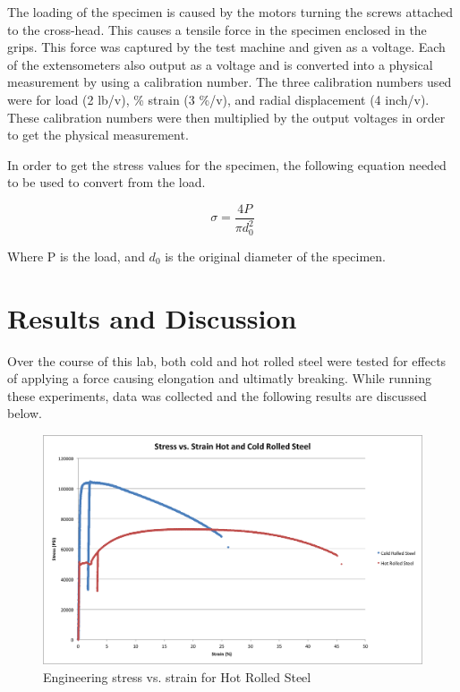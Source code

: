 \documentclass[12pt]{report}
\begin{document}
The loading of the specimen is caused by the motors turning the screws attached to the cross-head. This causes a tensile force in the specimen enclosed in the grips. This force was captured by the test machine and given as a voltage. Each of the extensometers also output as a voltage and is converted into a physical measurement by using a calibration number. The three calibration numbers used were for load (2 lb/v), \% strain (3 \%/v), and radial displacement (4 inch/v). These calibration numbers were then multiplied by the output voltages in order to get the physical measurement. 

In order to get the stress values for the specimen, the following equation needed to be used to convert from the load. 

\begin{equation}
        \sigma = \frac{4P}{\pi d_0^2}
	\label{equation:equation1}
\end{equation}

Where P is the load, and \(d_0\) is the original diameter of the specimen. 

\section{Results and Discussion}
\doublespacing

Over the course of this lab, both cold and hot rolled steel were tested for effects of applying a force causing elongation and ultimatly breaking. While running these experiments, data was collected and the following results are discussed below.

\begin{figure}[H]
	\includegraphics[width=1\textwidth]{stress_vs_strain.png}
	\caption{Engineering stress vs. strain for Hot Rolled Steel}
	\label{fig:Figure1}
\end{figure}
\end{document}
